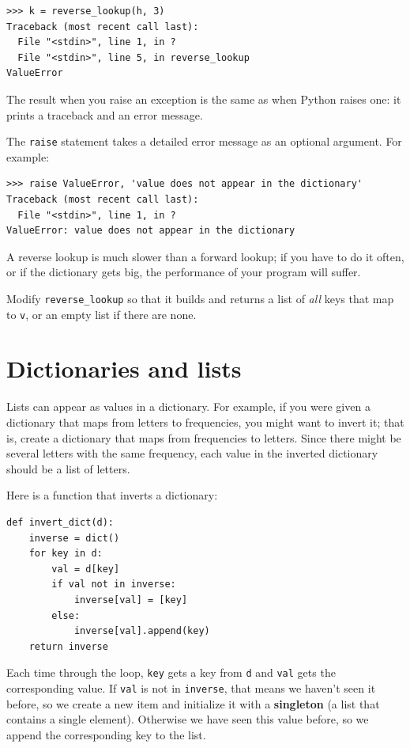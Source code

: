 \documentclass[10pt]{book}
\begin{document}
\begin{verbatim}
>>> k = reverse_lookup(h, 3)
Traceback (most recent call last):
  File "<stdin>", line 1, in ?
  File "<stdin>", line 5, in reverse_lookup
ValueError
\end{verbatim}
%
The result when you raise an exception is the same as when
Python raises one: it prints a traceback and an error message.

The {\tt raise} statement takes a detailed error message as an
optional argument.  For example:

\begin{verbatim}
>>> raise ValueError, 'value does not appear in the dictionary'
Traceback (most recent call last):
  File "<stdin>", line 1, in ?
ValueError: value does not appear in the dictionary
\end{verbatim}
%
A reverse lookup is much slower than a forward lookup; if you
have to do it often, or if the dictionary gets big, the performance
of your program will suffer.

\begin{exercise}

Modify \verb"reverse_lookup" so that it builds and returns a list
of {\em all} keys that map to {\tt v}, or an empty list if there
are none.

\end{exercise}


\section{Dictionaries and lists}
\label{invert}

Lists can appear as values in a dictionary.  For example, if you
were given a dictionary that maps from letters to frequencies, you
might want to invert it; that is, create a dictionary that maps
from frequencies to letters.  Since there might be several letters
with the same frequency, each value in the inverted dictionary
should be a list of letters.

Here is a function that inverts a dictionary:

\begin{verbatim}
def invert_dict(d):
    inverse = dict()
    for key in d:
        val = d[key]
        if val not in inverse:
            inverse[val] = [key]
        else:
            inverse[val].append(key)
    return inverse
\end{verbatim}
%
Each time through the loop, {\tt key} gets a key from {\tt d} and
{\tt val} gets the corresponding value.  If {\tt val} is not in {\tt inverse},
that means we haven't seen it before, so we create a new item and
initialize it with a {\bf singleton} (a list that contains a
single element).  Otherwise we have seen this value before, so we
append the corresponding key to the list.
\end{document}
